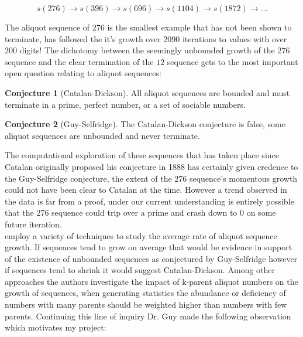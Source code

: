 \documentclass{article}
\theoremstyle{definition}
\newtheorem{conjecture}{Conjecture}[section]
\begin{document}
$$s(276) \rightarrow s(396) \rightarrow s(696) \rightarrow s(1104) \rightarrow s(1872)  \rightarrow ...$$

The aliquot sequence of 276 is the smallest example that has not been shown to terminate, \cite{zimmermann_2016} has followed the it's growth over 2090 iterations to values with over $200$ digits! The dichotomy between the seemingly unbounded growth of the $276$ sequence and the clear termination of the $12$ sequence gets to the most important open question relating to aliquot sequences:

\begin{conjecture}[Catalan-Dickson]
All aliquot sequences are bounded and must terminate in a prime, perfect number, or a set of sociable numbers. \cite{catalan_1888}
\end{conjecture}

\begin{conjecture}[Guy-Selfridge]
The Catalan-Dickson conjecture is false, some aliquot sequences are unbounded and never terminate. \cite{guy_selfridge_1975}
\end{conjecture}

The computational exploration of these sequences that has taken place since Catalan originally proposed his conjecture in 1888 has certainly given credence to the Guy-Selfridge conjecture, the extent of the $276$ sequence's momentous growth could not have been clear to Catalan at the time. However a trend observed in the data is far from a proof, under our current understanding is entirely possible that the 276 sequence could trip over a prime and crash down to $0$ on some future iteration.\\

\cite{chum_guy_jacobson_mosunov_2018} employ a variety of techniques to study the average rate of aliquot sequence growth. If sequences tend to grow on average that would be evidence in support of the existence of unbounded sequences as conjectured by Guy-Selfridge however if sequences tend to shrink it would suggest Catalan-Dickson. Among other approaches the authors investigate the impact of k-parent aliquot numbers on the growth of sequences, when generating statistics the abundance or deficiency of numbers with many parents should be weighted higher than numbers with few parents. Continuing this line of inquiry Dr. Guy made the following observation which motivates my project: 
\end{document}
